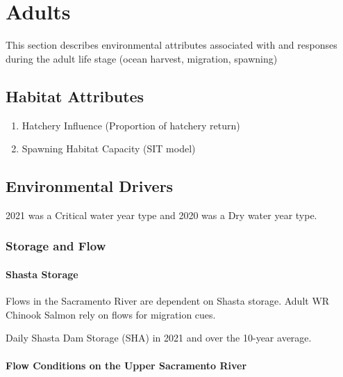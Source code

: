 \documentclass[
]{book}
\theoremstyle{definition}
\theoremstyle{definition}
\theoremstyle{definition}
\theoremstyle{definition}
\theoremstyle{remark}
\begin{document}
\hypertarget{adults}{%
\chapter{Adults}\label{adults}}

This section describes environmental attributes associated with and responses during the adult life stage (ocean harvest, migration, spawning)

\hypertarget{habitat-attributes}{%
\section{Habitat Attributes}\label{habitat-attributes}}

\begin{enumerate}
\def\labelenumi{\arabic{enumi}.}
\item
  Hatchery Influence (Proportion of hatchery return)
\item
  Spawning Habitat Capacity (SIT model)
\end{enumerate}

\hypertarget{wq}{%
\section{Environmental Drivers}\label{wq}}

2021 was a Critical water year type and 2020 was a Dry water year type.

\hypertarget{storage-and-flow}{%
\subsection{Storage and Flow}\label{storage-and-flow}}

\hypertarget{shasta-storage}{%
\subsubsection{Shasta Storage}\label{shasta-storage}}

Flows in the Sacramento River are dependent on Shasta storage. Adult WR Chinook Salmon rely on flows for migration cues.

\label{fig:SHAstor-fig}Daily Shasta Dam Storage (SHA) in 2021 and over the 10-year average.

\hypertarget{flow-conditions-on-the-upper-sacramento-river}{%
\subsubsection{Flow Conditions on the Upper Sacramento River}\label{flow-conditions-on-the-upper-sacramento-river}}
\end{document}
